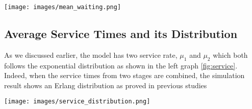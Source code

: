 \noindent
\begin{minipage}{\textwidth}
    \texttt{[image: images/mean\_waiting.png]}
    \label{bar}
\end{minipage}

\subsection{Average Service Times and its Distribution}

As we discussed earlier, the model has two service rate, $\mu_1$ and $\mu_2$ which both follows the exponential distribution as shown in the left graph \ref{fig:service}. Indeed, when the service times from two stages are combined, the simulation result shows an Erlang distribution as proved in previous studies \cite{Langaristwostage,ausinbayesian}

\noindent
\begin{minipage}{\textwidth}
	\texttt{[image: images/service\_distribution.png]}
	\label{fig:service}
\end{minipage}
